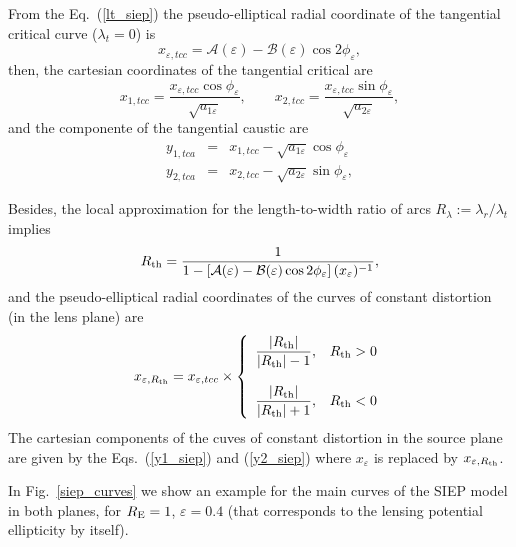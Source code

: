 From the Eq.~(\ref{lt_siep}) the pseudo-elliptical radial coordinate of the tangential critical curve  ($\lambda_t=0$) is
\begin{equation}
x_{\varepsilon,tcc}= \mathcal{A}(\varepsilon)-\mathcal{B}(\varepsilon)\cos{2\phi_\varepsilon}, 
\end{equation}
then, the cartesian coordinates of the tangential critical are
\begin{equation}
x_{1,tcc}=\dfrac{x_{\varepsilon,tcc}\cos{\phi_\varepsilon}}{\sqrt{a_{1\varepsilon}}},\qquad x_{2,tcc}=\dfrac{x_{\varepsilon,tcc}\sin{\phi_\varepsilon}}{\sqrt{a_{2\varepsilon}}},
\end{equation}
and the componente of the tangential caustic are
\begin{eqnarray}
y_{1,tca} &=&x_{1,tcc}-\sqrt{a_{1\varepsilon}}\cos{\phi_\varepsilon}\\
y_{2,tca} &=&x_{2,tcc}-\sqrt{a_{2\varepsilon}}\sin{\phi_\varepsilon},
\end{eqnarray}

Besides, the local approximation for the length-to-width ratio of arcs $R_\lambda:=\lambda_r/\lambda_t$ implies
\begin{equation}
R_{\rm th}=\dfrac{1}{1-\left[\mathcal{A}(\varepsilon)-\mathcal{B}(\varepsilon)\cos{2\phi_\varepsilon } \right](x_\varepsilon)^{-1}},
\end{equation}
and the pseudo-elliptical radial coordinates of the curves of constant distortion (in the lens plane) are
\begin{equation}
x_{\varepsilon,R_{\rm th}}=x_{\varepsilon,tcc}\times\left\{\begin{array}{cc} \dfrac{|R_{\rm th}|}{|R_{\rm th}|-1}, & R_{\rm th}>0 \\ & \\
\dfrac{|R_{\rm th}|}{|R_{\rm th}|+1}, & R_{\rm th}<0 \end{array}\right.
\end{equation}
The cartesian components of the cuves of constant distortion in the source plane are given by the Eqs.~(\ref{y1_siep}) and (\ref{y2_siep}) where $x_\varepsilon$ is replaced by $x_{\varepsilon,R_{\rm th}}$.

In Fig.~\ref{siep_curves} we show an example for the main curves of the SIEP model in both planes, for $R_{\rm E}=1$, $\varepsilon=0.4$ (that corresponds to the lensing potential ellipticity by itself).

